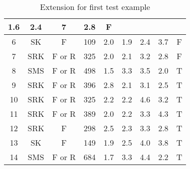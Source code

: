 \documentclass[12pt]{report}
\begin{document}
\begin{solution}
\begin{enumerate}
\begin{table}[H]
\begin{tabular}{|c|c|c|c|c|c|c|c|c|}
              1.6 &
              2.4 &
              7 &
              2.8 &
              F \\ \hline
            \rowcolor[HTML]{34FF34} 
            6 &
              SK &
              F &
              109 &
              2.0 &
              1.9 &
              2.4 &
              3.7 &
              F \\ \hline
            7 &
              \cellcolor[HTML]{FE0000}SRK &
              F or R &
              325 &
              2.0 &
              2.1 &
              3.2 &
              2.8 &
              F \\ \hline
            8 &
              \cellcolor[HTML]{FE0000}SMS &
              F or R &
              498 &
              1.5 &
              3.3 &
              3.5 &
              2.0 &
              T \\ \hline
            9 &
              \cellcolor[HTML]{FE0000}SRK &
              F or R &
              396 &
              2.8 &
              2.1 &
              3.1 &
              2.5 &
              T \\ \hline
            10 &
              \cellcolor[HTML]{FE0000}SRK &
              F or R &
              325 &
              2.2 &
              2.2 &
              4.6 &
              3.2 &
              T \\ \hline
            11 &
              \cellcolor[HTML]{FE0000}SRK &
              F or R &
              389 &
              2.0 &
              2.2 &
              3.3 &
              4.3 &
              T \\ \hline
            12 &
              \cellcolor[HTML]{FE0000}SRK &
              F &
              298 &
              2.5 &
              2.3 &
              3.3 &
              2.8 &
              T \\ \hline
            13 &
              SK &
              F &
              149 &
              1.9 &
              \cellcolor[HTML]{FE0000}2.5 &
              4.0 &
              3.8 &
              T \\ \hline
            14 &
              \cellcolor[HTML]{FE0000}SMS &
              F or R &
              684 &
              1.7 &
              3.3 &
              4.4 &
              2.2 &
              T \\ \hline
            \end{tabular}
            \caption{Extension for first test example}
            \label{table:ext1}
            \end{table}

\end{enumerate}
\end{solution}
\end{document}
